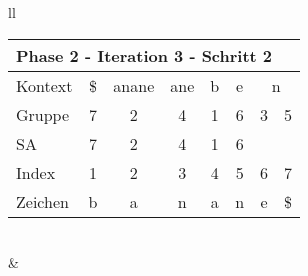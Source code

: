 \begin{table}[H]
\begin{adjustbox}{max width=\textwidth}
\begin{tabular}{ll}
\begin{tabular}{lccccccc}
\multicolumn{8}{l}{Phase 2 - Iteration 3 - Schritt 2}                                                                                                                                                                \\ \hline
\multicolumn{1}{l|}{Kontext} & \multicolumn{1}{c|}{\$} & \multicolumn{1}{c|}{anane} & \multicolumn{1}{c|}{\cellcolor[HTML]{\green}ane} & \multicolumn{1}{c|}{b}    & \multicolumn{1}{c|}{e} & \multicolumn{2}{c}{n} \\
\multicolumn{1}{l|}{Gruppe}  & \multicolumn{1}{c|}{7}  & \multicolumn{1}{c|}{2}     & \multicolumn{1}{c|}{\cellcolor[HTML]{\green}4}   & \multicolumn{1}{c|}{1}    & \multicolumn{1}{c|}{6} & 3         & 5          \\ 
\multicolumn{1}{l|}{SA}      & \multicolumn{1}{c|}{7}  & \multicolumn{1}{c|}{2}     & \multicolumn{1}{c|}{\cellcolor[HTML]{\green}4}   & \multicolumn{1}{c|}{1}    & \multicolumn{1}{c|}{6} &           &            \\ \hline
\multicolumn{1}{l|}{Index}   & 1                       & 2                          & 3                                                & \cellcolor[HTML]{\green}4 & 5                      & 6         & 7          \\
\multicolumn{1}{l|}{Zeichen} & b                       & a                          & n                                                & \cellcolor[HTML]{\green}a & n                      & e         & \$        
\end{tabular}

\\
&
\\


\end{tabular}
\end{adjustbox}
\end{table}
